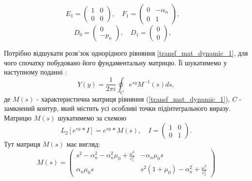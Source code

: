 \begin{equation*}
    E_1 = \begin{pmatrix}
        1 & 0 \\
        0 & 0
    \end{pmatrix}, \quad
    F_1 = \begin{pmatrix}
        0 & -\alpha_n \\
        0 & 1
    \end{pmatrix}, \quad
\end{equation*}
\begin{equation*}
    D_0 = \begin{pmatrix}
        0 \\
        -p_n
    \end{pmatrix}, \quad
    D_1 = \begin{pmatrix}
        0 \\
        0
    \end{pmatrix}, \quad
\end{equation*}

Потрібно відшукати розв'зок однорідного рівняння \eqref{transf_mat_dynamic_1},
для чого спочатку побудовано його фундаментальну матрицю.
Її шукатимемо у наступному поданні \cite{gantmaher}:
\begin{equation}
    Y(y) = \frac{1}{2\pi i} \oint_C e^{sy} M^{-1}(s)ds,
\end{equation}
де $M(s)$ - характеристична матриця рівняння (\ref{transf_mat_dynamic_1}), $C$ - замкнений контур, який містить усі особливі точки підінтегрального виразу.
Матрицю $M(s)$ шукатимемо за схемою
\begin{equation}
    L_2\left[ e^{sy}*I \right] = e^{sy} * M(s), \quad I = \begin{pmatrix} 1 & 0 \\ 0 & 1 \end{pmatrix}.
\end{equation}
Тут матриця $M(s)$ має вигляд:
\begin{equation}
    M(s) = \begin{pmatrix}
        s^2 - \alpha_n^2 - \alpha_n^2\mu_0 + \frac{\omega^2}{c_1^2} & -\alpha_n \mu_0 s \\
        \alpha_n \mu_0 s & s^2 (1 + \mu_0) -\alpha_n^2 + \frac{\omega^2}{c_2^2}
     \end{pmatrix}
\end{equation}

